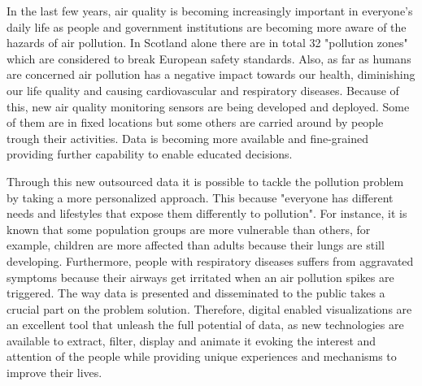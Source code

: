 In the last few years, air quality is becoming increasingly important in everyone's daily life as people and government institutions are becoming more aware of the hazards of air pollution. In Scotland alone there are in total 32 "pollution zones" which are considered to break European safety standards. Also, as far as humans are concerned air pollution has a negative impact towards our health, diminishing our life quality and causing cardiovascular and respiratory diseases. Because of this, new air quality monitoring sensors are being developed and deployed. Some of them are in fixed locations but some others are carried around by people trough their activities. Data is becoming more available and fine-grained providing further capability to enable educated decisions.

Through this new outsourced data it is possible to tackle the pollution problem by taking a  more personalized approach. This because "everyone has different needs and lifestyles that expose them differently to pollution". For instance, it is known that some population groups are more vulnerable than others, for example, children are more affected than adults because their lungs are still developing. Furthermore, people with respiratory diseases suffers from aggravated symptoms because their airways get irritated when an air pollution spikes are triggered. The way data is presented and disseminated to the public takes a crucial part on the problem solution. Therefore, digital enabled visualizations are  an excellent tool that unleash the full potential of data, as new technologies are available to extract, filter, display and animate it evoking the interest and attention of the people while providing unique experiences and mechanisms to improve their lives.

\iffalse
The effects of air pollution on human health are still complex to understand and there is much research ongoing on the combination short and long term effects upon a person's health. 
\fi